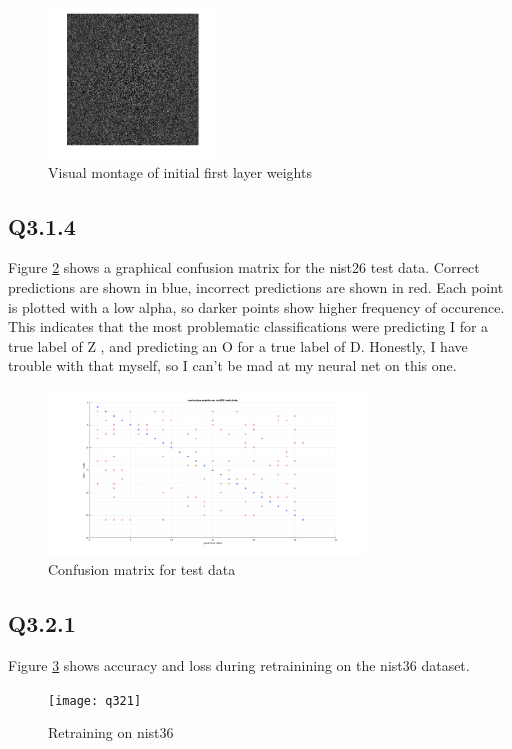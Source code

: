 \documentclass[12pt]{article}
\begin{document}
\begin{figure}[H]
\centering
\includegraphics[page=1,width=0.4\textwidth]{init_weight_montage}
\caption{Visual montage of initial first layer weights } 
\label{fig:initweightviz}
\end{figure}   

\subsection{Q3.1.4}
Figure \ref{fig:initweightviz} shows a graphical confusion matrix for the nist26 test data. Correct predictions are shown in blue, incorrect predictions are shown in red. Each point is plotted with a low alpha, so darker points show higher frequency of occurence. This indicates that the most problematic classifications were predicting I for a true label of Z , and predicting an O for a true label of D. Honestly, I have trouble with that myself, so I can't be mad at my neural net on this one.

\begin{figure}[H]
\centering
\includegraphics[page=1,width=0.75\textwidth]{q314confusion}
\caption{ Confusion matrix for test data } 
\label{fig:initweightviz}
\end{figure}   

\subsection{Q3.2.1}
Figure \ref{fig:nist36retrain} shows accuracy and loss during retrainining on the nist36 dataset.
\begin{figure}[H]
\centering
\texttt{[image: q321]}
\caption{ Retraining on nist36 } 
\label{fig:nist36retrain}
\end{figure}   
\end{document}
